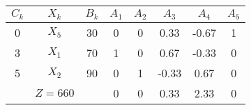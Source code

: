     \begin{tabular}{cccccccc}
    \hline
    \hline
    $C_k$   & $X_k$   & $B_k$   & $A_1$   & $A_2$   & $A_3$   & $A_4$   & $A_5$ \bigstrut\\
    \hline
    0       & $X_5$   & 30      & 0       & 0       & 0.33    & -0.67   & 1 \bigstrut[t]\\
    3       & $X_1$   & 70      & 1       & 0       & 0.67    & -0.33   & 0 \\
    5       & $X_2$   & 90      & 0       & 1       & -0.33   & 0.67    & 0 \bigstrut[b]\\
    \hline
            & $Z=660$ &         & 0       & 0       & 0.33    & 2.33    & 0 \bigstrut\\
    \hline
    \hline
    \end{tabular}%

